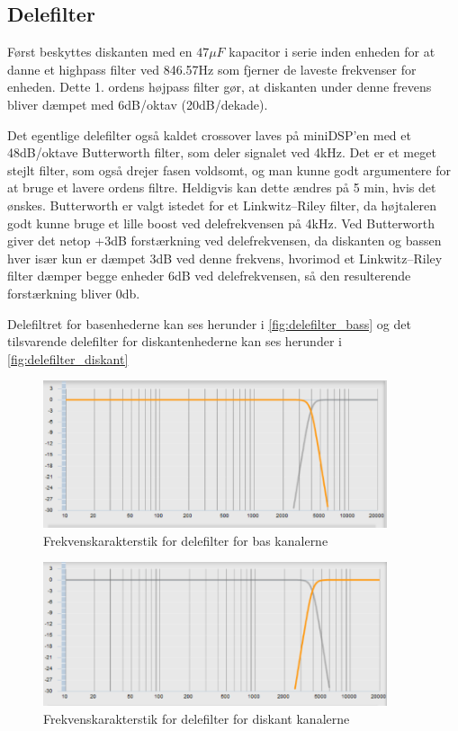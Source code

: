 \subsection{Delefilter}
Først beskyttes diskanten med en $47\mu F$ kapacitor i serie inden enheden for at danne et highpass filter ved 846.57Hz som fjerner de laveste frekvenser for enheden. Dette 1. ordens højpass filter gør, at diskanten under denne frevens bliver dæmpet med 6dB/oktav (20dB/dekade). 

Det egentlige delefilter også kaldet crossover laves på miniDSP'en med et 48dB/oktave Butterworth filter, som deler signalet ved 4kHz. Det er et meget stejlt filter, som også drejer fasen voldsomt, og man kunne godt argumentere for at bruge et lavere ordens filtre. Heldigvis kan dette ændres på 5 min, hvis det ønskes. Butterworth er valgt istedet for et Linkwitz–Riley filter, da højtaleren godt kunne bruge et lille boost ved delefrekvensen på 4kHz. Ved Butterworth giver det netop +3dB forstærkning ved delefrekvensen, da diskanten og bassen hver især kun er dæmpet 3dB ved denne frekvens, hvorimod et Linkwitz–Riley filter dæmper begge enheder 6dB ved delefrekvensen, så den resulterende forstærkning bliver 0db.  

Delefiltret for basenhederne kan ses herunder i \autoref{fig:delefilter_bass} og det tilsvarende delefilter for diskantenhederne kan ses herunder i \autoref{fig:delefilter_diskant}
\begin{figure}[H]
	\center
	\includegraphics[width=0.9\textwidth]{figur/delefilter_bass}
	\caption{Frekvenskarakterstik for delefilter for bas kanalerne }
	\label{fig:delefilter_bass}
\end{figure}

\begin{figure}[H]
	\center
	\includegraphics[width=0.9\textwidth]{figur/delefilter_diskant}
	\caption{Frekvenskarakterstik for delefilter for diskant kanalerne }
	\label{fig:delefilter_diskant}
\end{figure}

